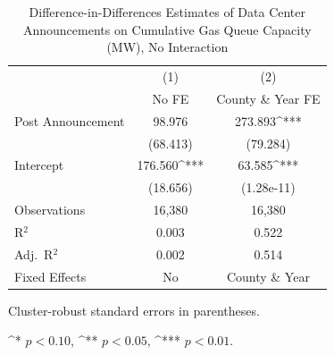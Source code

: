 \documentclass[sigconf]{acmart}
\newcommand{\sym}[1]{^{#1}}
\begin{document}
\begin{table}[htbp]\centering
\caption{Difference-in-Differences Estimates of Data Center Announcements on Cumulative Gas Queue Capacity (MW), No Interaction}
\begin{threeparttable}
\begin{tabular}{lcc}
\toprule
& (1) & (2) \\
& No FE & County \& Year FE \\
\midrule
Post Announcement & 98.976 & 273.893\sym{***} \\
& (68.413) & (79.284) \\
Intercept & 176.560\sym{***} & 63.585\sym{***} \\
& (18.656) & (1.28e-11) \\
\midrule
Observations & 16,380 & 16,380 \\
R$^2$ & 0.003 & 0.522 \\
Adj.\ R$^2$ & 0.002 & 0.514 \\
Fixed Effects & No & County \& Year \\
\bottomrule
\end{tabular}
\begin{tablenotes}[flushleft]
\footnotesize
\item Cluster-robust standard errors in parentheses. 
\item \sym{*} $p<0.10$, \sym{**} $p<0.05$, \sym{***} $p<0.01$. 
\end{tablenotes}
\end{threeparttable}
\label{DIDNGInteract}
\end{table}
\end{document}
